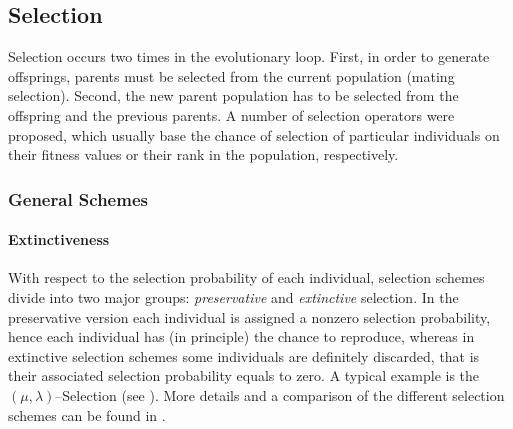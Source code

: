 %
%

        \subsection{Selection}

Selection occurs two times in the evolutionary loop.
First, in order to generate offsprings, parents must be selected from the
current population (mating selection).
Second, the new parent population has to be selected
from the offspring and the previous parents.
A number of selection operators were proposed, which usually base the
chance of selection of particular individuals on their fitness values or their
rank in the population, respectively.

        \subsubsection{General Schemes}





        \paragraph{Extinctiveness}

With respect to the selection probability of each individual,
selection schemes divide into two major groups:
\emph{preservative} and
\emph{extinctive} selection. In the preservative
version each individual is assigned a nonzero selection probability,
hence each individual has (in principle) the chance to reproduce,
whereas in extinctive selection schemes some individuals are
definitely discarded, that is their associated selection probability
equals to zero.  A typical example is the $(\mu,\lambda)$--Selection
(see
).  More details and
a comparison of the different selection schemes can be found in
\cite{Baeck:91}.


